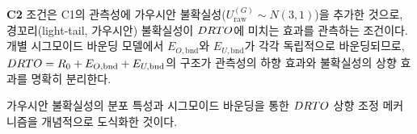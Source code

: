 

\section{}
\label{sec:result_c2}

\textbf{C2} 조건은 C1의 관측성에 가우시안 불확실성($U_{\text{raw}}^{(G)} \sim N(3,1)$)을
추가한 것으로, 경꼬리(light-tail, 가우시안) 불확실성이 $DRTO$에 미치는 효과를
관측하는 조건이다.
개별 시그모이드 바운딩 모델에서 $E_{O,\text{bnd}}$와 $E_{U,\text{bnd}}$가
각각 독립적으로 바운딩되므로,
$DRTO = R_0 + E_{O,\text{bnd}} + E_{U,\text{bnd}}$의 구조가
관측성의 하향 효과와 불확실성의 상향 효과를 명확히 분리한다.

 가우시안 불확실성의 분포 특성과
시그모이드 바운딩을 통한 $DRTO$ 상향 조정 메커니즘을 개념적으로 도식화한 것이다.

